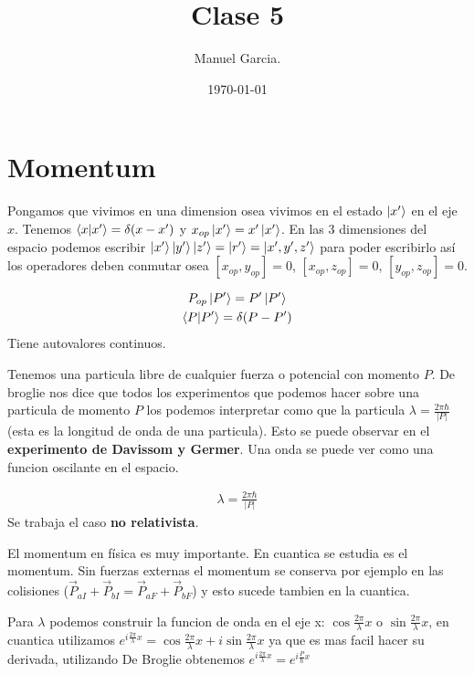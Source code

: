 \documentclass{article}
\title{Clase 5}
\author{Manuel Garcia.}
\date{\today}
\newcommand{\caja}[3]{%
  \begin{tcolorbox}[colback=#1!5!white,colframe=#1!25!black,title=#2]
    #3
  \end{tcolorbox}%
}
\begin{document}
\maketitle

\section{Momentum }
Pongamos que vivimos en una dimension osea vivimos en el estado $ \ket{x'} $ en el eje $ x  $. Tenemos $ \bra{x}\ket{x' }=\delta(x-x')  $ y $ x _{op } \ket{x'}=x'\ket{x'} $. En las 3 dimensiones del espacio podemos escribir $ \ket{x' }\ket{y' }\ket{z' } = \ket{r'} = \ket{x',y',z'} $ para poder escribirlo así los operadores deben conmutar osea $ [x _{op } , y _{op } ] = 0 $, $ [x _{op } , z _{op } ]=0  $, $ [y _{op } , z _{op } ] = 0  $.

\caja{green}{Momentum }{
  \begin{gather}
    P _{op } \ket{P' } = P'\ket{P' }\\  
    \bra{P }\ket{P' } = \delta(P-P') 
    \label{eq:momentum }
  \end{gather}
  Tiene autovalores continuos.
}
Tenemos una particula libre de cualquier fuerza o potencial con momento $ P  $. De broglie nos dice que todos los experimentos que podemos hacer sobre una particula de momento $ P  $ los podemos interpretar como que la particula $ \lambda = \frac{2 \pi \hbar }{\left|P \right|} $ (esta es la longitud de onda de una particula). Esto se puede observar en el \textbf{experimento de Davissom y Germer}. Una onda se puede ver como una funcion oscilante en el espacio.

\caja{green}{Longitud de onda de una particula (De Broglie) }{
  \begin{gather}
    \lambda = \frac{2 \pi \hbar }{\left|P \right|} 
    \label{eq:de_broglie}
  \end{gather}
  Se trabaja el caso \textbf{no relativista}. 
}

El momentum en física es muy importante. En cuantica se estudia es el momentum. Sin fuerzas externas el momentum se conserva por ejemplo en las colisiones ($ \vec P _{aI } + \vec P _{bI } = \vec{P} _{aF } + \vec P _{bF }  $) y esto sucede tambien en la cuantica. 

Para $ \lambda $ podemos construir la funcion de onda en el eje x: $ \cos{\frac{2 \pi }{\lambda }x} $ o $ \sin{\frac{2 \pi}{\lambda}x } $, en cuantica utilizamos $ e ^ {i \frac{2 \pi }{\lambda }x } =\cos{\frac{2 \pi}{\lambda}x }+i \sin{\frac{2 \pi}{\lambda}x }  $ ya que es mas facil hacer su derivada, utilizando De Broglie obtenemos $ e ^ {i \frac{2 \pi }{\lambda }x } = e ^ {i \frac{P }{\hbar }x } $
\end{document}
